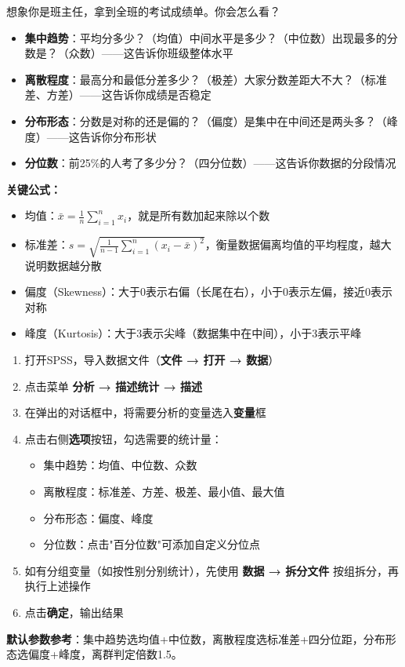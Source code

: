 \begin{algoprinciple}
想象你是班主任，拿到全班的考试成绩单。你会怎么看？

\begin{itemize}
    \item \textbf{集中趋势}：平均分多少？（均值）中间水平是多少？（中位数）出现最多的分数是？（众数）——这告诉你班级整体水平
    \item \textbf{离散程度}：最高分和最低分差多少？（极差）大家分数差距大不大？（标准差、方差）——这告诉你成绩是否稳定
    \item \textbf{分布形态}：分数是对称的还是偏的？（偏度）是集中在中间还是两头多？（峰度）——这告诉你分布形状
    \item \textbf{分位数}：前25\%的人考了多少分？（四分位数）——这告诉你数据的分段情况
\end{itemize}

\textbf{关键公式：}
\begin{itemize}
    \item 均值：$\bar{x} = \frac{1}{n}\sum_{i=1}^{n}x_i$，就是所有数加起来除以个数
    \item 标准差：$s = \sqrt{\frac{1}{n-1}\sum_{i=1}^{n}(x_i-\bar{x})^2}$，衡量数据偏离均值的平均程度，越大说明数据越分散
    \item 偏度（Skewness）：大于0表示右偏（长尾在右），小于0表示左偏，接近0表示对称
    \item 峰度（Kurtosis）：大于3表示尖峰（数据集中在中间），小于3表示平峰
\end{itemize}
\end{algoprinciple}

\begin{algosposs}
\begin{enumerate}
    \item 打开SPSS，导入数据文件（\textbf{文件 → 打开 → 数据}）
    \item 点击菜单 \textbf{分析 → 描述统计 → 描述}
    \item 在弹出的对话框中，将需要分析的变量选入\textbf{变量}框
    \item 点击右侧\textbf{选项}按钮，勾选需要的统计量：
    \begin{itemize}
        \item 集中趋势：均值、中位数、众数
        \item 离散程度：标准差、方差、极差、最小值、最大值
        \item 分布形态：偏度、峰度
        \item 分位数：点击"百分位数"可添加自定义分位点
    \end{itemize}
    \item 如有分组变量（如按性别分别统计），先使用 \textbf{数据 → 拆分文件} 按组拆分，再执行上述操作
    \item 点击\textbf{确定}，输出结果
\end{enumerate}

\textbf{默认参数参考}：集中趋势选均值+中位数，离散程度选标准差+四分位距，分布形态选偏度+峰度，离群判定倍数1.5。
\end{algosposs}

